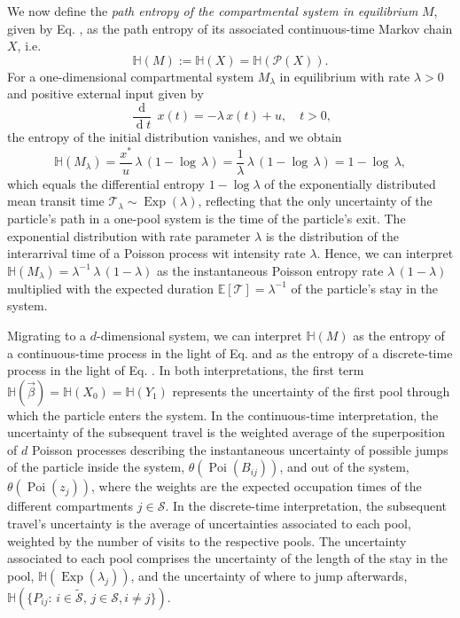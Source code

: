 \documentclass[smallextended]{svjour3}
\makeatletter
\renewcommand*{\eqref}[1]{%
  \hyperref[{#1}]{\textup{\tagform@{\ref*{#1}}}}%
}
\newcommand{\E}{\mathbb{E}}
\newcommand{\TT}{\mathcal{T}}
\renewcommand{\H}{\mathbb{H}}
\newcommand{\Exp}{\operatorname{Exp}}
\newcommand{\Poi}{\operatorname{Poi}}
\newcommand{\deriv}[1]{\frac{\operatorname{d}}{\operatorname{d}#1}}
\newcommand{\ie}{i.e.}
\makeatother
\begin{document}
We now define the \emph{path entropy of the compartmental system in equilibrium} $M$, given by Eq. \eqref{eqn:lin_CS_sys}, as the path entropy of its associated continuous-time Markov chain $X$, \ie
\begin{equation*}
  \H(M):=\H(X)=\H(\mathcal{P}(X)).
\end{equation*}
For a one-dimensional compartmental system $M_\lambda$ in equilibrium with rate $\lambda>0$ and positive external input given by
\begin{equation}
  \deriv{t}\,x(t) = -\lambda\,x(t) + u,\quad t>0,
\end{equation}
the entropy of the initial distribution vanishes, and we obtain
\begin{equation*}
  \H(M_\lambda) = \frac{x^\ast}{u}\,\lambda\,(1-\log\,\lambda) = \frac{1}{\lambda}\,\lambda\,(1-\log\,\lambda) = 1-\log\,\lambda,
\end{equation*}  
which equals the differential entropy $1-\log\lambda$ of the exponentially distributed mean transit time $\TT_\lambda\sim\Exp(\lambda)$, reflecting that the only uncertainty of the particle's path in a one-pool system is the time of the particle's exit.
The exponential distribution with rate parameter $\lambda$ is the distribution of the interarrival time of a Poisson process wit intensity rate $\lambda$.
Hence, we can interpret $\H(M_\lambda) = \lambda^{-1}\,\lambda\,(1-\lambda)$ as the instantaneous Poisson entropy rate $\lambda\,(1-\lambda)$ multiplied with the expected duration $\E\left[\TT\right]=\lambda^{-1}$ of the particle's stay in the system.

Migrating to a $d$-dimensional system, we can interpret $\H(M)$ as the entropy of a continuous-time process in the light of Eq. \eqref{eqn:H_occupation_time} and as the entropy of a discrete-time process in the light of Eq. \eqref{eqn:H_number_of_visits}.
In both interpretations, the first term $\H(\vec{\beta})=\H(X_0)=\H(Y_1)$ represents the uncertainty of the first pool through which the particle enters the system.
In the continuous-time interpretation, the uncertainty of the subsequent travel is the weighted average of the superposition of $d$ Poisson processes describing the instantaneous uncertainty of possible jumps of the particle inside the system, $\theta(\Poi(B_{ij}))$, and out of the system, $\theta(\Poi(z_j))$, where the weights are the expected occupation times of the different compartments $j\in\mathcal{S}$. 
In the discrete-time interpretation, the subsequent travel's uncertainty is the average of uncertainties associated to each pool, weighted by the number of visits to the respective pools.
The uncertainty associated to each pool comprises the uncertainty of the length of the stay in the pool, $\H(\Exp(\lambda_j))$, and the uncertainty of where to jump afterwards, $\H(\{P_{ij}:\,i\in\widetilde{\mathcal{S}},\,j\in\mathcal{S},i\neq j\})$.
\end{document}
